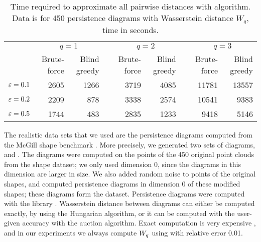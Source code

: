 \begin{table}\centering
    \begin{tabular}{@{}rrrcrrcrr@{}}\toprule
                          & \multicolumn{2}{c}{$q=1$} & \phantom{abc} & \multicolumn{2}{c}{$q=2$} & \phantom{abc} & \multicolumn{2}{c}{$q=3$}\\
                          \cmidrule{2-3} \cmidrule{5-6} \cmidrule{8-9}
                          & Brute-force & Blind greedy && Brute-force & Blind greedy && Brute-force & Blind greedy \\ \midrule
$\varepsilon = 0.1$    &   2605  &  1266  &&  3719  &  4085  &&  11781  &  13557\\
$\varepsilon = 0.2$    &   2209  &  878  &&  3338  &  2574  &&  10541   &  9383\\
$\varepsilon = 0.5$    &   1744  &  483  &&  2835  &  1233  &&  9418    &  5146\\
\bottomrule
\end{tabular}
    \caption{Time required to approximate all pairwise distances with \bgrdy algorithm.
    Data is for 450  persistence diagrams with Wasserstein distance $W_q$, time in seconds.}
\label{tbl:mcgill_original_blind_greedy_spanner_timing}
\end{table}




The realistic data sets that we used
are the persistence diagrams
computed from the McGill shape benchmark \cite{zhang2005mcgill}.
More precisely, we generated two sets of diagrams,
 and . The 
diagrams were computed on the points of the 450 original
point clouds from the shape dataset; we only used
dimension 0, since the diagrams in this dimension are larger in size.
We also added random noise to points of the original shapes,
and computed persistence diagrams in dimension 0 of these modified
shapes; these diagrams form the  dataset.
Persistence diagrams were computed with the 
library \cite{bauer2014distributed}. 
Wasserstein distance between diagrams can either be computed exactly,
by using the Hungarian algorithm, or
it can be computed with the user-given accuracy with the auction algorithm.
Exact computation is very expensive \cite{kerber2017geometry}, 
and in our experiments we always compute ${W_{q}}$ using \hera with relative error 0.01.



